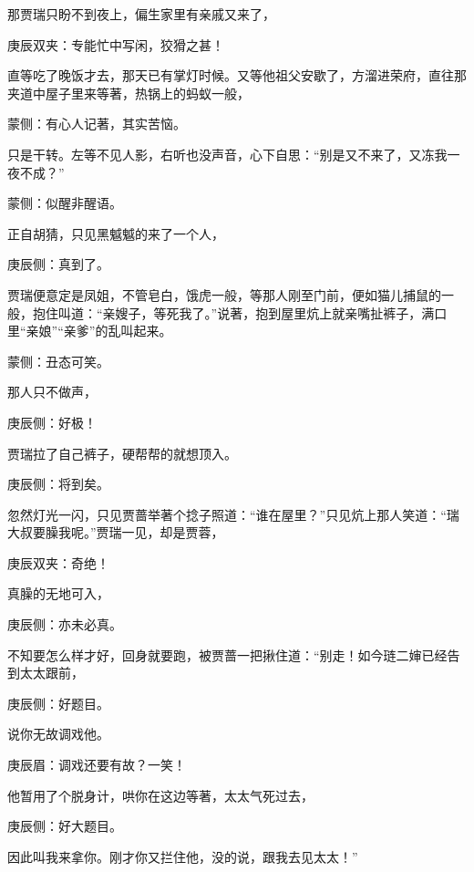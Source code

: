\begin{parag}
    那贾瑞只盼不到夜上，偏生家里有亲戚又来了，\begin{note}庚辰双夹：专能忙中写闲，狡猾之甚！\end{note}直等吃了晚饭才去，那天已有掌灯时候。又等他祖父安歇了，方溜进荣府，直往那夹道中屋子里来等著，热锅上的蚂蚁一般，\begin{note}蒙侧：有心人记著，其实苦恼。\end{note}只是干转。左等不见人影，右听也没声音，心下自思：“别是又不来了，又冻我一夜不成？”\begin{note}蒙侧：似醒非醒语。\end{note}正自胡猜，只见黑魆魆的来了一个人，\begin{note}庚辰侧：真到了。\end{note}贾瑞便意定是凤姐，不管皂白，饿虎一般，等那人刚至门前，便如猫儿捕鼠的一般，抱住叫道：“亲嫂子，等死我了。”说著，抱到屋里炕上就亲嘴扯裤子，满口里“亲娘”“亲爹”的乱叫起来。\begin{note}蒙侧：丑态可笑。\end{note}那人只不做声，\begin{note}庚辰侧：好极！\end{note}贾瑞拉了自己裤子，硬帮帮的就想顶入。\begin{note}庚辰侧：将到矣。\end{note}忽然灯光一闪，只见贾蔷举著个捻子照道：“谁在屋里？”只见炕上那人笑道：“瑞大叔要臊我呢。”贾瑞一见，却是贾蓉，\begin{note}庚辰双夹：奇绝！\end{note}真臊的无地可入，\begin{note}庚辰侧：亦未必真。\end{note}不知要怎么样才好，回身就要跑，被贾蔷一把揪住道：“别走！如今琏二婶已经告到太太跟前，\begin{note}庚辰侧：好题目。\end{note}说你无故调戏他。\begin{note}庚辰眉：调戏还要有故？一笑！\end{note}他暂用了个脱身计，哄你在这边等著，太太气死过去，\begin{note}庚辰侧：好大题目。\end{note}因此叫我来拿你。刚才你又拦住他，没的说，跟我去见太太！”
\end{parag}


